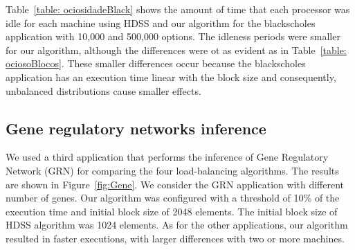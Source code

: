 \documentclass[journal]{IEEEtran}
\begin{document}
Table~\ref{table: ociosidadeBlack} shows the amount of time that each processor
was idle for each machine using HDSS and our algorithm for the blackscholes
application with 10,000 and 500,000 options. The idleness periods were smaller
for our algorithm, although the differences were ot as evident as in
Table~\ref{table: ociosoBlocos}. These smaller differences occur because the
blackscholes application has an execution time linear with the block size and
consequently, unbalanced distributions cause smaller effects.




\subsection{Gene regulatory networks inference}

We used a third application that performs the inference of Gene Regulatory
Network (GRN) for comparing the four load-balancing algorithms. The results are
shown in Figure~\ref{fig:Gene}. We consider the GRN application with different
number of genes. Our algorithm was configured with a threshold of 10\% of the
execution time and initial block size of 2048 elements. The initial block size
of HDSS algorithm was 1024 elements. As for the other applications, our
algorithm resulted in faster executions, with larger differences with two or
more machines.
\end{document}
